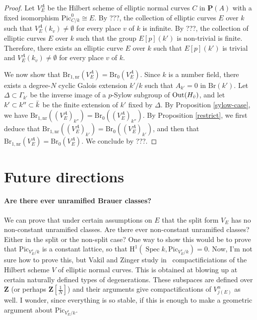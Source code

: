 \documentclass[10pt,letterpaper,twoside]{article}
\renewcommand{\H}{\mathrm{H}}
\renewcommand{\1}{\mathbf{1}}
\newcommand{\bP}{\mathbf{P}}
\newcommand{\bZ}{\mathbf{Z}}
\newcommand{\nr}{\mathrm{nr}}
\newcommand{\Pic}{\mathrm{Pic}}
\newcommand{\Br}{\mathrm{Br}}
\DeclareMathOperator{\Spec}{Spec}
\newcommand{\iso}{\cong}
\theoremstyle{plain}
\theoremstyle{plain}
\theoremstyle{definition}
\theoremstyle{named}
\theoremstyle{definition}
\begin{document}
	\begin{proof}
		Let $V_E^A$ be the Hilbert scheme of elliptic normal curves $C$ in $\bP(A)$ with a fixed isomorphism $\Pic_{C/k}^0\iso E$. By ???, the collection of elliptic curves $E$ over $k$ such that $V_E^A(k_v)\neq \emptyset$ for every place $v$ of $k$ is infinite. By ???, the collection of elliptic curves $E$ over $k$ such that the group $E[p](k')$ is non-trivial is finite. Therefore, there exists an elliptic curve $E$ over $k$ such that $E[p](k')$ is trivial and $V_E^A(k_v)\neq \emptyset$ for every place $v$ of $k$.
		
		We now show that $\Br_{1,\nr}(V_E^A)=\Br_0(V_E^A)$. Since $k$ is a number field, there exists a degree-$N$ cyclic Galois extension $k'/k$ such that $A_{k'}=0$ in $\Br(k')$. Let $\Delta\subset \Gamma_{k'}$ be the inverse image of a $p$-Sylow subgroup of $\mathrm{Out}(H_{\Bar{v}})$, and let $k'\subset k''\subset\Bar{k}$ be the finite extension of $k'$ fixed by $\Delta$. By Proposition \ref{sylow-case}, we have $\Br_{1,\nr}((V_E^A)_{k''})=\Br_0((V_E^A)_{k''})$. By Proposition \ref{restrict}, we first deduce that $\Br_{1,\nr}((V_E^A)_{k'})=\Br_0((V_E^A)_{k'})$, and then that $\Br_{1,\nr}(V_E^A)=\Br_0(V_E^A)$. We conclude by ???.
	\end{proof}
	
	
	\section{Future directions}
	
	\paragraph{Are there ever unramified Brauer classes?} We can prove that under certain assumptions on
	$E$ that the split form $V_E$ has no non-constant unramified classes. Are there ever non-constant
	unramified classes? Either in the split or the non-split case? One way to show this would be to
	prove that $\Pic_{V^c_E/k}$ is a constant lattice, so that $\H^1(\Spec k,\Pic_{V^c_E/k})=0$. Now,
	I'm not sure how to prove this, but Vakil and Zinger study
	in~\cite{vakil-zinger,vakil-zinger-announce} compactificiations of the Hilbert scheme $V$ of elliptic normal
	curves. This is obtained at blowing up at certain naturally defined types of degenerations. These
	subspaces are defined over $\bZ$ (or perhaps $\bZ[\tfrac{1}{N}]$) and their arguments give
	compactifications of $V_{j(E)}^\alpha$ as well. I wonder, since everything is so stable, if this is
	enough to make a geometric argument about $\Pic_{V^c_E/k}$.
	
\end{document}
